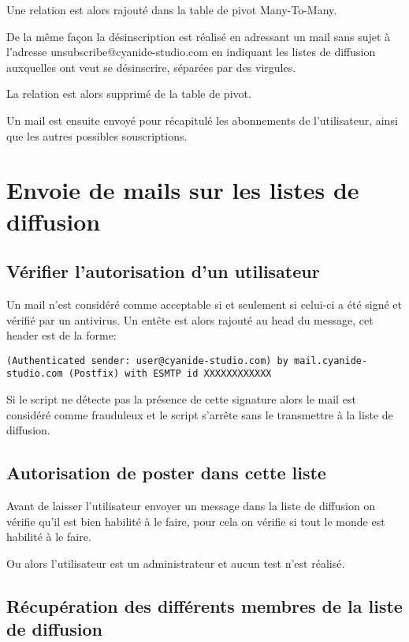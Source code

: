 Une relation est alors rajouté dans la table de pivot Many-To-Many.

De la même façon la désinscription est réalisé en adressant un mail sans sujet à l'adresse unsubscribe@cyanide-studio.com  en indiquant les listes de diffusion auxquelles  ont veut se désinscrire, séparées par des virgules.

La relation est alors supprimé de la table de pivot.

Un mail est ensuite envoyé pour récapitulé les abonnements de l'utilisateur, ainsi que les autres possibles souscriptions.

\section*{Envoie de mails sur les listes de diffusion}

\subsection*{Vérifier l'autorisation d'un utilisateur}

Un mail n'est considéré comme acceptable si et seulement si celui-ci a été signé et vérifié par un antivirus. Un entête est alors rajouté au head du message, cet header est de la forme:

\begin{lstlisting}
(Authenticated sender: user@cyanide-studio.com) by mail.cyanide-studio.com (Postfix) with ESMTP id XXXXXXXXXXXX
\end{lstlisting}
	
Si le script ne détecte pas la présence de cette signature alors le mail est considéré comme frauduleux et le script s'arrête sans le transmettre à la liste de diffusion.

\subsection*{Autorisation de poster dans cette liste}
Avant de laisser l'utilisateur envoyer un message dans la liste de diffusion on vérifie qu'il est bien habilité à le faire, pour cela on vérifie si tout le monde est habilité à le faire.

Ou alors l'utilisateur est un administrateur et aucun test n'est réalisé.

\subsection*{Récupération des différents membres de la liste de diffusion}

